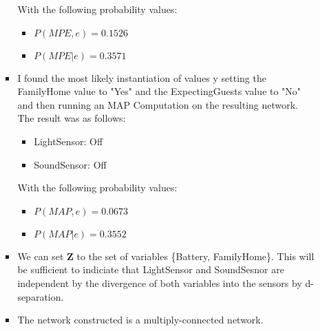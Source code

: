 \documentclass[12pt]{article}
\begin{document}
\begin{enumerate}
\begin{enumerate}
\begin{itemize}
			With the following probability values:

			\begin{itemize}
				\item $P(MPE,e) = 0.1526$
				\item $P(MPE|e) = 0.3571$
			\end{itemize}

			\item I found the most likely instantiation of values y setting the FamilyHome value to "Yes" and the ExpectingGuests value to "No" and then running an MAP Computation on the resulting network. The result was as follows:

			\begin{itemize}
				\item LightSensor: Off
				\item SoundSensor: Off
			\end{itemize}

			With the following probability values:

			\begin{itemize}
				\item $P(MAP,e) = 0.0673$
				\item $P(MAP|e) = 0.3552$
			\end{itemize}

			\item We can set \textbf{Z} to the set of variables \{Battery, FamilyHome\}. This will be sufficient to indiciate that LightSensor and SoundSesnor are independent by the divergence of both variables into the sensors by d-separation.

			\item The network constructed is a multiply-connected network.
		\end{itemize}
	\end{enumerate}
\end{enumerate}
\end{document}
